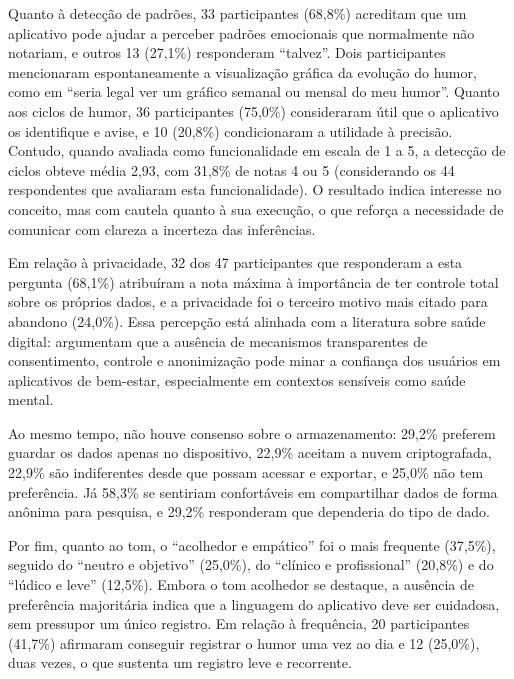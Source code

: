 
Quanto à detecção de padrões, 33 participantes (68,8\%) acreditam que um
aplicativo pode ajudar a perceber padrões emocionais que normalmente não
notariam, e outros 13 (27,1\%) responderam ``talvez''. Dois participantes
mencionaram espontaneamente a visualização gráfica da evolução do humor, como
em ``seria legal ver um gráfico semanal ou mensal do meu humor''. Quanto aos
ciclos de humor, 36 participantes (75,0\%) consideraram útil que o aplicativo
os identifique e avise, e 10 (20,8\%) condicionaram a utilidade à precisão.
Contudo, quando avaliada como funcionalidade em escala de 1 a 5, a detecção de
ciclos obteve média 2,93, com 31,8\% de notas 4 ou 5 (considerando os 44
respondentes que avaliaram esta funcionalidade). O resultado indica interesse
no conceito, mas com cautela quanto à sua execução, o que reforça a
necessidade de comunicar com clareza a incerteza das inferências.

Em relação à privacidade, 32 dos 47 participantes que responderam a esta
pergunta (68,1\%) atribuíram a nota máxima à importância de ter controle
total sobre os próprios dados, e a privacidade foi o terceiro motivo mais
citado para abandono (24,0\%). Essa percepção está alinhada com a literatura
sobre saúde digital:
\citet{Iwaya:22} argumentam que a ausência de mecanismos transparentes de
consentimento, controle e anonimização pode minar a confiança dos usuários em
aplicativos de bem-estar, especialmente em contextos sensíveis como saúde
mental.

Ao mesmo tempo, não houve consenso sobre o armazenamento: 29,2\% preferem
guardar os dados apenas no dispositivo, 22,9\% aceitam a nuvem criptografada,
22,9\% são indiferentes desde que possam acessar e exportar, e 25,0\% não tem
preferência. Já 58,3\% se sentiriam confortáveis em compartilhar dados de forma
anônima para pesquisa, e 29,2\% responderam que dependeria do tipo de dado.

Por fim, quanto ao tom, o ``acolhedor e empático'' foi o mais frequente
(37,5\%), seguido do ``neutro e objetivo'' (25,0\%), do ``clínico e
profissional'' (20,8\%) e do ``lúdico e leve'' (12,5\%). Embora o tom acolhedor
se destaque, a ausência de preferência majoritária indica que a linguagem do
aplicativo deve ser cuidadosa, sem pressupor um único registro. Em relação à
frequência, 20 participantes (41,7\%) afirmaram conseguir registrar o humor uma
vez ao dia e 12 (25,0\%), duas vezes, o que sustenta um registro leve e
recorrente.

